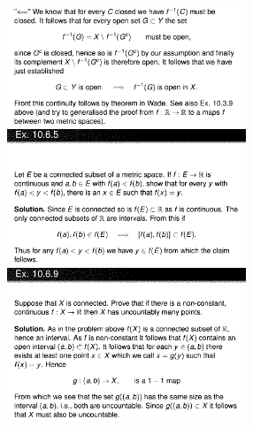 \documentclass[8pt,landscape]{article}
\begin{document}
\begin{multicols}{3}
    \includegraphics[width=270]{Slides26.png} \\
    \includegraphics[width=270]{Slides27.png} \\
    \includegraphics[width=270]{Slides28.png} \\
\end{multicols}
\end{document}
